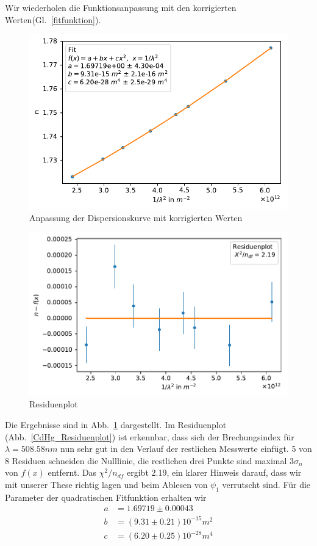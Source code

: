 \documentclass[12pt,a4paper]{article}
\begin{document}
Wir wiederholen die Funktionsanpassung mit den korrigierten Werten(Gl.~\eqref{fitfunktion}).
\begin{figure}[H]
	\centering
	\includegraphics[width=0.7\linewidth]{Python/CdHg_LinReg.pdf}
	\caption{Anpassung der Dispersionskurve mit korrigierten Werten}
	\label{CdHg_LinReg}
\end{figure}
\begin{figure}[H]
	\centering
	\includegraphics[width=0.7\linewidth]{Python/CdHg_Residuen.pdf}
	\caption{Residuenplot}
	\label{CdHg_Residuenplot}
\end{figure}
Die Ergebnisse sind in Abb.~\ref{CdHg_LinReg} dargestellt. Im Residuenplot (Abb.~\eqref{CdHg_Residuenplot}) ist erkennbar, dass sich der Brechungsindex für $\lambda=508.58nm$ nun sehr gut in den Verlauf der restlichen Messwerte einfügt. 5 von 8 Residuen schneiden die Nulllinie, die restlichen drei Punkte sind maximal $3\sigma_n$ von $f(x)$ entfernt. Das $\chi^2/n_{df}$ ergibt 2.19, ein klarer Hinweis darauf, dass wir mit unserer These richtig lagen und beim Ablesen von $\psi_1$ verrutscht sind. Für die Parameter der quadratischen Fitfunktion erhalten wir
\begin{align}\label{Parameterwerte}
a&=1.69719\pm0.00043\\
b&=(9.31\pm0.21)10^{-15}m^2\nonumber\\
c&=(6.20\pm0.25)10^{-28}m^4\nonumber
\end{align}
\end{document}

